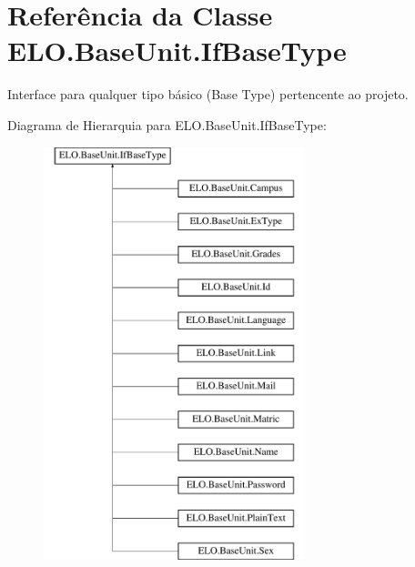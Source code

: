 \hypertarget{classELO_1_1BaseUnit_1_1IfBaseType}{\section{Referência da Classe E\-L\-O.\-Base\-Unit.\-If\-Base\-Type}
\label{classELO_1_1BaseUnit_1_1IfBaseType}
}


Interface para qualquer tipo básico (Base Type) pertencente ao projeto.  


Diagrama de Hierarquia para E\-L\-O.\-Base\-Unit.\-If\-Base\-Type\-:\begin{figure}[H]
\begin{center}
\leavevmode
\includegraphics[height=12.000000cm]{d7/d79/classELO_1_1BaseUnit_1_1IfBaseType}
\end{center}
\end{figure}
